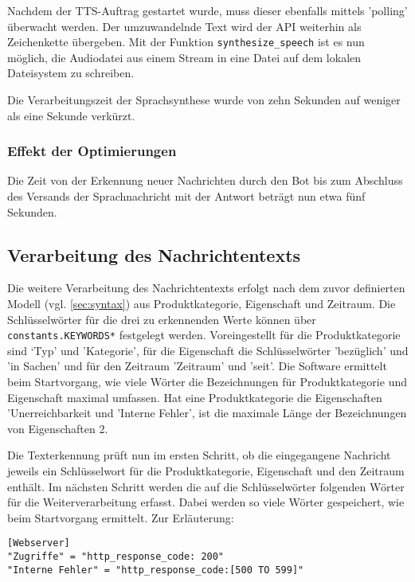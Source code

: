 Nachdem der TTS-Auftrag gestartet wurde, muss dieser ebenfalls mittels 'polling' überwacht werden. Der umzuwandelnde Text wird der API weiterhin als Zeichenkette übergeben. Mit der Funktion \lstinline{synthesize_speech} ist es nun möglich, die Audiodatei aus einem Stream in eine Datei auf dem lokalen Dateisystem zu schreiben. 

Die Verarbeitungszeit der Sprachsynthese wurde von zehn Sekunden auf weniger als eine Sekunde verkürzt.

\subsubsection{Effekt der Optimierungen}

Die Zeit von der Erkennung neuer Nachrichten durch den Bot bis zum Abschluss des Versands der Sprachnachricht mit der Antwort beträgt nun etwa fünf Sekunden.

\subsection{Verarbeitung des Nachrichtentexts}

Die weitere Verarbeitung des Nachrichtentexts erfolgt nach dem zuvor definierten Modell (vgl. \autoref{sec:syntax}) aus Produktkategorie, Eigenschaft und Zeitraum. Die Schlüsselwörter für die drei zu erkennenden Werte können über \lstinline{constants.KEYWORDS*} festgelegt werden. Voreingestellt für die Produktkategorie sind ‘Typ' und 'Kategorie', für die Eigenschaft die Schlüsselwörter 'bezüglich' und 'in Sachen' und für den Zeitraum 'Zeitraum' und 'seit'. Die Software ermittelt beim Startvorgang, wie viele Wörter die Bezeichnungen für Produktkategorie und Eigenschaft maximal umfassen. Hat eine Produktkategorie die Eigenschaften 'Unerreichbarkeit und 'Interne Fehler', ist die maximale Länge der Bezeichnungen von Eigenschaften 2. 

Die Texterkennung prüft nun im ersten Schritt, ob die eingegangene Nachricht jeweils ein Schlüsselwort für die Produktkategorie, Eigenschaft und den Zeitraum enthält. Im nächsten Schritt werden die auf die Schlüsselwörter folgenden Wörter für die Weiterverarbeitung erfasst. Dabei werden so viele Wörter gespeichert, wie beim Startvorgang ermittelt. Zur Erläuterung:

\begin{lstlisting}[caption={Auszug aus der Datei config.toml}, label=config-toml, xleftmargin=6mm]
[Webserver]
"Zugriffe" = "http_response_code: 200"
"Interne Fehler" = "http_response_code:[500 TO 599]"
\end{lstlisting}

